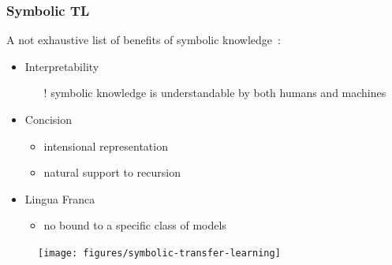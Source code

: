 \documentclass[presentation]{beamer}\mode<presentation>{\usetheme{blackAMSBolognaFC}}
\begin{document}
\begin{frame}[allowframebreaks]
\frametitle{Symbolic TL}

    A not exhaustive list of benefits of \alert{symbolic} knowledge~:
    \vspace{0.5cm}
    \begin{itemize}
        \item Interpretability
        \begin{itemize}
            \item[!] symbolic knowledge is understandable by both humans and machines
        \end{itemize}

        \vfill

        \item Concision
        \begin{itemize}
            \item intensional representation
            \item natural support to recursion
        \end{itemize}

        \vfill

        \item Lingua Franca
        \begin{itemize}
            \item no bound to a specific class of models
        \end{itemize}

        \vfill

    \end{itemize}

    \framebreak

    \centering
    \begin{figure}
        \texttt{[image: figures/symbolic-transfer-learning]}
    \end{figure}

\end{frame}
\end{document}
